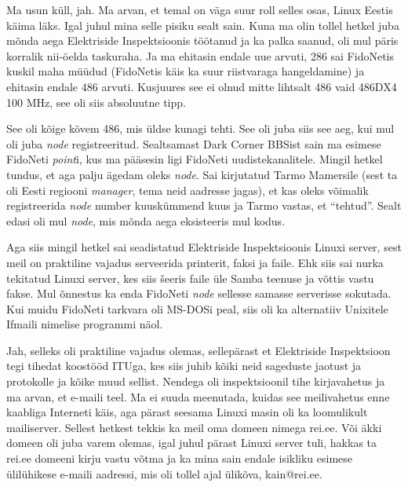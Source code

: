 
Ma usun küll, jah. Ma arvan, et temal on väga suur roll selles osas, Linux 
Eestis käima läks. Igal juhul mina selle pisiku sealt sain. Kuna ma olin tollel 
hetkel juba mõnda aega Elektriside Inspektsioonis töötanud ja ka palka saanud, oli mul päris korralik nii-öelda  
taskuraha. Ja ma ehitasin  endale uue arvuti, 286 sai FidoNetis  kuskil maha 
müüdud (FidoNetis  käis ka suur riistvaraga hangeldamine) ja ehitasin endale 
486 arvuti. Kusjuures see ei olnud mitte lihtsalt 486 vaid 486DX4 
100 MHz, see oli siis absoluutne tipp. 

See oli kõige kõvem 486, mis üldse kunagi tehti. See oli  juba siis see aeg, 
kui mul oli juba \emph{node} registreeritud. Sealtsamast Dark Corner 
BBSist sain ma esimese FidoNeti \emph{point}i, kus ma 
pääsesin ligi FidoNeti uudistekanalitele. Mingil hetkel tundus, et aga palju 
ägedam oleks \emph{node}. Sai kirjutatud Tarmo Mamersile (sest ta oli Eesti regiooni \emph{manager}, tema neid aadresse jagas), 
et kas oleks võimalik registreerida \emph{node} number kuuskümmend kuus ja 
Tarmo vastas, et \enquote{tehtud}. Sealt edasi oli mul \emph{node}, mis mõnda 
aega eksisteeris mul kodus. 

Aga siis mingil hetkel sai seadistatud Elektriside Inspektsioonis 
Linuxi server, sest meil on praktiline vajadus serveerida 
printerit, faksi ja faile. Ehk siis sai nurka tekitatud Linuxi server, kes siis 
šeeris faile üle Samba teenuse ja võttis vastu fakse. Mul õnnestus ka enda 
FidoNeti \emph{node} sellesse samasse serverisse sokutada. Kui muidu FidoNeti 
tarkvara oli MS-DOSi peal, siis  oli ka alternatiiv Unixitele 
Ifmaili nimelise programmi näol.


Jah, selleks oli praktiline vajadus  olemas, sellepärast et Elektriside 
Inspektsioon tegi tihedat koostööd 
ITUga, kes siis 
juhib kõiki neid sageduste jaotust ja protokolle ja  kõike muud sellist. 
Nendega oli inspektsioonil tihe kirjavahetus ja ma arvan, et e-maili teel. Ma 
ei suuda meenutada, kuidas see meilivahetus enne kaabliga Interneti käis, aga  
pärast  seesama Linuxi masin oli ka loomulikult mailiserver. Sellest hetkest 
tekkis ka meil oma domeen nimega rei.ee. Või äkki domeen oli juba varem olemas, 
igal juhul pärast Linuxi server tuli, hakkas ta rei.ee domeeni  kirju vastu 
võtma ja ka mina sain endale isikliku esimese ülilühikese e-maili aadressi, mis 
oli tollel ajal ülikõva, kain@rei.ee.

